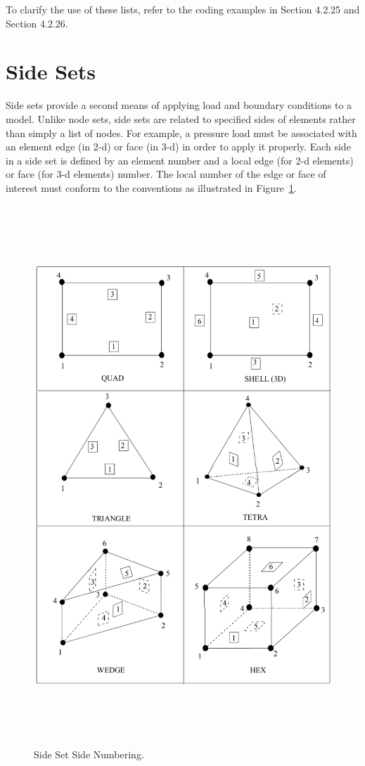 To clarify the use of these lists, refer to the coding examples
in  Section 4.2.25 and  Section 4.2.26.

\section{Side Sets}

Side sets provide a second means of applying load and boundary
conditions to a model. Unlike node sets, side sets are related to
specified sides of elements rather than simply a list of nodes. For
example, a pressure load must be associated with an element edge (in
2-d) or face (in 3-d) in order to apply it properly. Each side in a
side set is defined by an element number and a local edge (for 2-d
elements) or face (for 3-d elements) number. The local number of the
edge or face of interest must conform to the conventions as
illustrated in Figure~\ref{f:SideSetNumbering}.
\begin{figure}[htbp]
\begin{center}
\includegraphics[width=6.250in, height=8.000in]{figures/SideSetNumbering.png}
\caption{Side Set Side Numbering.}\label{f:SideSetNumbering}
\end{center}
\end{figure}

